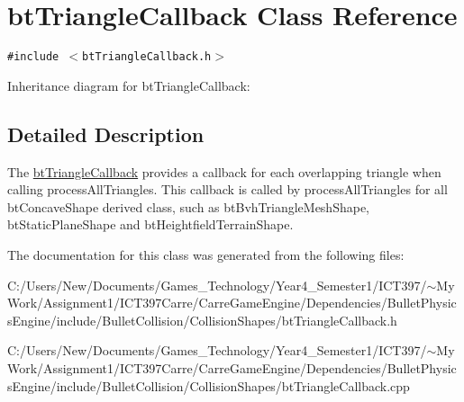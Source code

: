 \hypertarget{classbt_triangle_callback}{
\section{btTriangleCallback Class Reference}
\label{classbt_triangle_callback}
}
{\tt \#include $<$btTriangleCallback.h$>$}

Inheritance diagram for btTriangleCallback:

\subsection{Detailed Description}
The \hyperlink{classbt_triangle_callback}{btTriangleCallback} provides a callback for each overlapping triangle when calling processAllTriangles. This callback is called by processAllTriangles for all btConcaveShape derived class, such as btBvhTriangleMeshShape, btStaticPlaneShape and btHeightfieldTerrainShape. 

The documentation for this class was generated from the following files:\begin{CompactItemize}
\item 
C:/Users/New/Documents/Games\_\-Technology/Year4\_\-Semester1/ICT397/$\sim$My Work/Assignment1/ICT397Carre/CarreGameEngine/Dependencies/BulletPhysicsEngine/include/BulletCollision/CollisionShapes/btTriangleCallback.h\item 
C:/Users/New/Documents/Games\_\-Technology/Year4\_\-Semester1/ICT397/$\sim$My Work/Assignment1/ICT397Carre/CarreGameEngine/Dependencies/BulletPhysicsEngine/include/BulletCollision/CollisionShapes/btTriangleCallback.cpp\end{CompactItemize}

